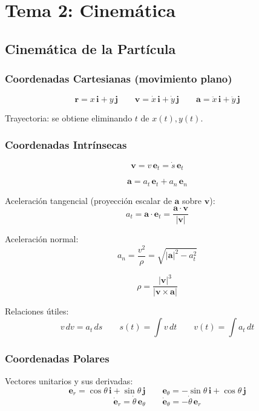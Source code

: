 \documentclass[12pt,a4paper]{article}
\begin{document}
\newpage

\section{Tema 2: Cinemática}

\subsection{Cinemática de la Partícula}

\subsubsection*{Coordenadas Cartesianas (movimiento plano)}

\[
\mathbf{r} = x\,\mathbf{i} + y\,\mathbf{j}
\qquad
\mathbf{v} = \dot{x}\,\mathbf{i} + \dot{y}\,\mathbf{j}
\qquad
\mathbf{a} = \ddot{x}\,\mathbf{i} + \ddot{y}\,\mathbf{j}
\]

Trayectoria: se obtiene eliminando $t$ de $x(t), y(t)$.

\subsubsection*{Coordenadas Intrínsecas}

\[
\mathbf{v} = v\,\mathbf{e}_t = \dot{s}\,\mathbf{e}_t
\]

\[
\mathbf{a} = a_t\,\mathbf{e}_t + a_n\,\mathbf{e}_n
\]

Aceleración tangencial (proyección escalar de $\mathbf{a}$ sobre $\mathbf{v}$):
\[
a_t = \mathbf{a} \cdot \mathbf{e}_t = \frac{\mathbf{a} \cdot \mathbf{v}}{|\mathbf{v}|}
\]

Aceleración normal:
\[
a_n = \frac{v^2}{\rho} = \sqrt{|\mathbf{a}|^2 - a_t^2}
\]

\begin{formbox}
\[
\rho = \frac{|\mathbf{v}|^3}{|\mathbf{v} \times \mathbf{a}|}
\]
\end{formbox}

Relaciones útiles:
\[
v\,dv = a_t\,ds \qquad
s(t) = \int v\,dt \qquad
v(t) = \int a_t\,dt
\]

\subsubsection*{Coordenadas Polares}

Vectores unitarios y sus derivadas:
\[
\mathbf{e}_r = \cos\theta\,\mathbf{i} + \sin\theta\,\mathbf{j}
\qquad
\mathbf{e}_\theta = -\sin\theta\,\mathbf{i} + \cos\theta\,\mathbf{j}
\]
\[
\dot{\mathbf{e}}_r = \dot{\theta}\,\mathbf{e}_\theta
\qquad
\dot{\mathbf{e}}_\theta = -\dot{\theta}\,\mathbf{e}_r
\]
\end{document}
